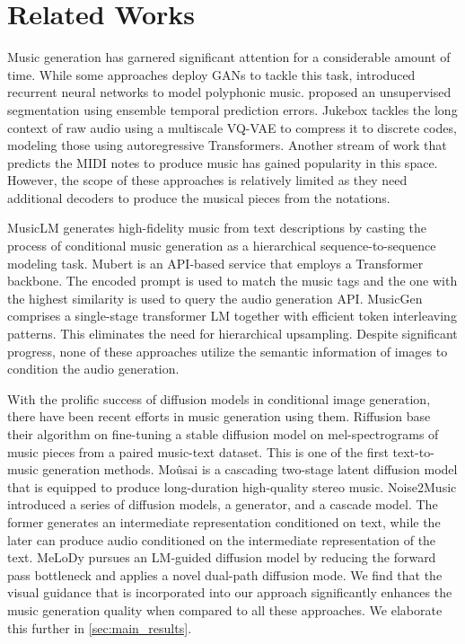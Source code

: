 \section{Related Works}
\label{sec:related_works}

Music generation has garnered significant attention for a considerable amount of time. While some approaches \cite{yang2017midinet, muhamed2021symbolic, dong2018musegan} deploy GANs to tackle this task, \citet{ycart2017study} introduced recurrent neural networks to model polyphonic music. \citet{bassan} proposed an unsupervised segmentation using ensemble temporal prediction errors. Jukebox \cite{dhariwal2020jukebox} tackles the long context of raw audio using a multiscale VQ-VAE to compress it to discrete codes, modeling those using autoregressive Transformers. Another stream of work \cite{gan2020foley, yang2017midinet} that predicts the MIDI notes to produce music has gained popularity in this space. However, the scope of these approaches is relatively limited as they need additional decoders to produce the musical pieces from the notations. 

MusicLM \cite{musiclm} generates high-fidelity music from text descriptions by casting the process of conditional music generation as a hierarchical sequence-to-sequence modeling task. 
Mubert \cite{mubert} is an API-based service that employs a Transformer backbone. The encoded prompt is used to match the music tags and the one with the highest similarity is used to query the audio generation API. 
MusicGen \cite{musicgen} comprises a single-stage transformer LM together with efficient token interleaving patterns. This eliminates the need for hierarchical upsampling. Despite significant progress, none of these approaches utilize the semantic information of images to condition the audio generation.

With the prolific success of diffusion models in conditional image generation, there have been recent efforts in music generation using them. Riffusion \cite{riffusion} base their algorithm on fine-tuning a stable diffusion model \cite{rombach2022high} on mel-spectrograms of music pieces from a paired
music-text dataset. This is one of the first text-to-music generation methods. 
Moûsai \cite{mousai} is a cascading two-stage latent diffusion model that is equipped to produce long-duration high-quality stereo music. 
Noise2Music \cite{noise2music} introduced a series of diffusion models, a generator, and a cascade model. The former generates an intermediate representation
conditioned on text, while the later can produce audio conditioned on the intermediate representation of the text. 
MeLoDy \cite{melody} pursues an LM-guided diffusion model by reducing the forward pass bottleneck and applies a novel dual-path diffusion mode. We find that the visual guidance that is incorporated into our approach significantly enhances the music generation quality when compared to all these approaches. We elaborate this further in \cref{sec:main_results}.

